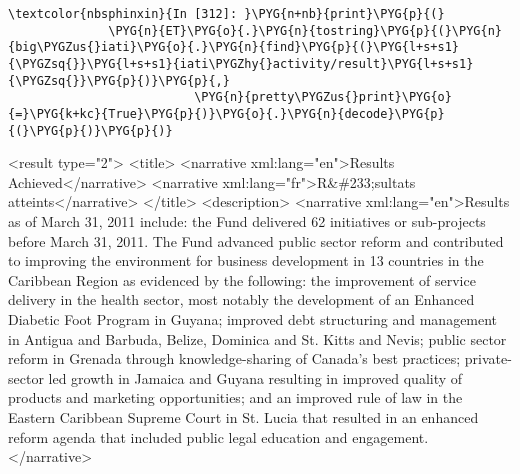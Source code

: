 \documentclass[letterpaper,10pt,english]{sphinxmanual}
\begin{document}
\begin{Verbatim}[commandchars=\\\{\}]
\textcolor{nbsphinxin}{In [312]: }\PYG{n+nb}{print}\PYG{p}{(}
              \PYG{n}{ET}\PYG{o}{.}\PYG{n}{tostring}\PYG{p}{(}\PYG{n}{big\PYGZus{}iati}\PYG{o}{.}\PYG{n}{find}\PYG{p}{(}\PYG{l+s+s1}{\PYGZsq{}}\PYG{l+s+s1}{iati\PYGZhy{}activity/result}\PYG{l+s+s1}{\PYGZsq{}}\PYG{p}{)}\PYG{p}{,}
                          \PYG{n}{pretty\PYGZus{}print}\PYG{o}{=}\PYG{k+kc}{True}\PYG{p}{)}\PYG{o}{.}\PYG{n}{decode}\PYG{p}{(}\PYG{p}{)}\PYG{p}{)}
\end{Verbatim}
%
\begin{OriginalVerbatim}[commandchars=\\\{\}]
<result type="2">
  <title>
    <narrative xml:lang="en">Results Achieved</narrative>
    <narrative xml:lang="fr">R\&\#233;sultats atteints</narrative>
  </title>
  <description>
    <narrative xml:lang="en">Results as of March 31, 2011 include: the Fund delivered 62 initiatives or sub-projects before March 31, 2011. The Fund advanced public sector reform and contributed to improving the environment for business development in 13 countries in the Caribbean Region as evidenced by the following: the improvement of service delivery in the health sector, most notably the development of an Enhanced Diabetic Foot Program in Guyana; improved debt structuring and management in Antigua and Barbuda, Belize, Dominica and St. Kitts and Nevis; public sector reform in Grenada through knowledge-sharing of Canada's best practices; private-sector led growth in Jamaica and Guyana resulting in improved quality of products and marketing opportunities; and an improved rule of law in the Eastern Caribbean Supreme Court in St. Lucia that resulted in an enhanced reform agenda that included public legal education and engagement.</narrative>

\end{OriginalVerbatim}
\end{document}
